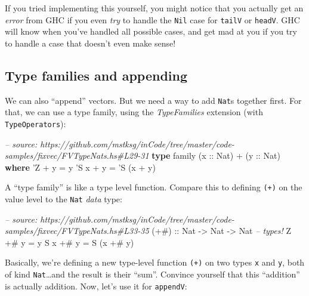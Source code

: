 \documentclass[]{article}
\newenvironment{Shaded}{\begin{snugshade}}{\end{snugshade}}
\newcommand{\CharTok}[1]{\textcolor[rgb]{0.31,0.60,0.02}{#1}}
\newcommand{\CommentTok}[1]{\textcolor[rgb]{0.56,0.35,0.01}{\textit{#1}}}
\newcommand{\DataTypeTok}[1]{\textcolor[rgb]{0.13,0.29,0.53}{#1}}
\newcommand{\FunctionTok}[1]{\textcolor[rgb]{0.00,0.00,0.00}{#1}}
\newcommand{\KeywordTok}[1]{\textcolor[rgb]{0.13,0.29,0.53}{\textbf{#1}}}
\newcommand{\NormalTok}[1]{#1}
\newcommand{\OtherTok}[1]{\textcolor[rgb]{0.56,0.35,0.01}{#1}}
\begin{document}
If you tried implementing this yourself, you might notice that you actually get
an \emph{error} from GHC if you even \emph{try} to handle the \texttt{Nil} case
for \texttt{tailV} or \texttt{headV}. GHC will know when you've handled all
possible cases, and get mad at you if you try to handle a case that doesn't even
make sense!

\hypertarget{type-families-and-appending}{%
\subsection{Type families and appending}\label{type-families-and-appending}}

We can also ``append'' vectors. But we need a way to add \texttt{Nat}s together
first. For that, we can use a type family, using the \emph{TypeFamilies}
extension (with \texttt{TypeOperators}):

\begin{Shaded}
\begin{Highlighting}[]
\CommentTok{-- source: https://github.com/mstksg/inCode/tree/master/code-samples/fixvec/FVTypeNats.hs#L29-31}
\KeywordTok{type}\NormalTok{ family (}\OtherTok{x ::} \DataTypeTok{Nat}\NormalTok{) }\FunctionTok{+}\NormalTok{ (}\OtherTok{y ::} \DataTypeTok{Nat}\NormalTok{) }\KeywordTok{where}
    \CharTok{'Z   + y = y}
    \CharTok{'S x + y = '}\DataTypeTok{S}\NormalTok{ (x }\FunctionTok{+}\NormalTok{ y)}
\end{Highlighting}
\end{Shaded}

A ``type family'' is like a type level function. Compare this to defining
\texttt{(+)} on the value level to the \texttt{Nat} \emph{data} type:

\begin{Shaded}
\begin{Highlighting}[]
\CommentTok{-- source: https://github.com/mstksg/inCode/tree/master/code-samples/fixvec/FVTypeNats.hs#L33-35}
\OtherTok{(+#) ::} \DataTypeTok{Nat} \OtherTok{->} \DataTypeTok{Nat} \OtherTok{->} \DataTypeTok{Nat}       \CommentTok{-- types!}
\DataTypeTok{Z}   \FunctionTok{+#}\NormalTok{ y }\FunctionTok{=}\NormalTok{ y}
\DataTypeTok{S}\NormalTok{ x }\FunctionTok{+#}\NormalTok{ y }\FunctionTok{=} \DataTypeTok{S}\NormalTok{ (x }\FunctionTok{+#}\NormalTok{ y)}
\end{Highlighting}
\end{Shaded}

Basically, we're defining a new type-level function \texttt{(+)} on two types
\texttt{x} and \texttt{y}, both of kind \texttt{Nat}\ldots{}and the result is
their ``sum''. Convince yourself that this ``addition'' is actually addition.
Now, let's use it for \texttt{appendV}:
\end{document}
